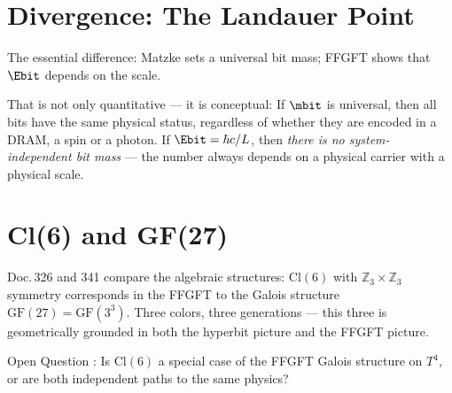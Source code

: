 \section{Divergence: The Landauer Point}

The essential difference: Matzke sets a universal bit mass;
FFGFT shows that $\Ebit$ depends on the scale. 

That is not only quantitative --- it is conceptual: If $\mbit$ is universal,
then all bits have the same physical status, regardless of whether they are encoded
in a DRAM, a spin or a photon.
If $\Ebit = \hbar c/L$, then \emph{there is no system-independent
bit mass} --- the number always depends on a physical carrier
with a physical scale.

\section{Cl(6) and GF(27)}

Doc.\,326 and 341 compare the algebraic structures:
$\mathrm{Cl}(6)$ with $\mathbb{Z}_3 \times \mathbb{Z}_3$ symmetry corresponds
in the FFGFT to the Galois structure $\mathrm{GF}(27) = \mathrm{GF}(3^3)$.
Three colors, three generations --- this three is geometrically grounded in both the hyperbit picture
and the FFGFT picture. 

Open Question : Is $\mathrm{Cl}(6)$ a special case of the
FFGFT Galois structure on $T^4$, or are both independent paths to the
same physics?